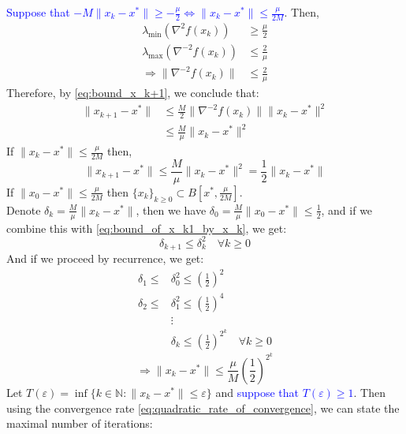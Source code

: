 \documentclass[12pt, openany]{report}
\newcommand{\N}{\mathbb{N}}
\theoremstyle{definition}
\begin{document}
\textcolor{blue}{Suppose that $-M \|x_k-x^*\| \geq - \frac{\mu}{2} \Leftrightarrow \|x_k-x^*\| \leq \frac{\mu}{2M}$}. Then,
\begin{equation}
	\begin{aligned}
		\lambda_{\min}(\nabla^2 f(x_k)) &\geq \frac{\mu}{2}\\
		\lambda_{\max}(\nabla^{-2} f(x_k)) &\leq \frac{2}{\mu}\\
		\Rightarrow \|\nabla^{-2} f(x_k)\| &\leq \frac{2}{\mu}
	\end{aligned}
\end{equation}
Therefore, by \eqref{eq:bound_x_k+1}, we conclude that:
\begin{equation}
	\begin{aligned}
		\|x_{k+1}-x^*\| &\leq \frac{M}{2}\|\nabla^{-2}f(x_k)\|\|x_k-x^*\|^2\\
		&\leq \frac{M}{\mu}\|x_k-x^*\|^2
	\end{aligned}
\end{equation}
If $\|x_k-x^*\| \leq \frac{\mu}{2M}$ then,
\begin{equation}\label{eq:bound_of_x_k1_by_x_k}
	\|x_{k+1}-x^*\| \leq \frac{M}{\mu} \|x_k - x^*\|^2 = \frac{1}{2} \|x_k - x^*\|
\end{equation}
If $\|x_0-x^*\| \leq \frac{\mu}{2M}$ then $\{x_k\}_{k\geq0} \subset B[x^*,\frac{\mu}{2M}]$.\\
Denote $\delta_k = \frac{M}{\mu} \|x_k-x^*\|$, then we have $\delta_0 = \frac{M}{\mu} \|x_0-x^*\| \leq \frac{1}{2}$, and if we combine this with \eqref{eq:bound_of_x_k1_by_x_k}, we get:
\begin{equation}
	\delta_{k+1} \leq \delta_k^2 \quad \forall k \geq 0
\end{equation}
And if we proceed by recurrence, we get:
\begin{equation}
	\begin{aligned}
		\delta_1 \leq &\delta_0^2 \leq \left(\frac{1}{2}\right)^2\\
		\delta_2 \leq &\delta_1^2 \leq \left(\frac{1}{2}\right)^4\\
		&\vdots\\
		&\delta_k \leq \left(\frac{1}{2}\right)^{2^k} \quad \forall k \geq 0
	\end{aligned}
\end{equation}
\begin{equation}\label{eq:quadratic_rate_of_convergence}
	\Rightarrow \|x_k-x^*\|\leq \frac{\mu}{M} \left(\frac{1}{2}\right)^{2^k}
\end{equation}
Let $T(\varepsilon) = \inf\{k\in\N: \|x_k-x^*\|\leq \varepsilon\}$ and \textcolor{blue}{suppose that $T(\varepsilon) \geq 1$}. Then using the convergence rate \eqref{eq:quadratic_rate_of_convergence}, we can state the maximal number of iterations:
\end{document}
